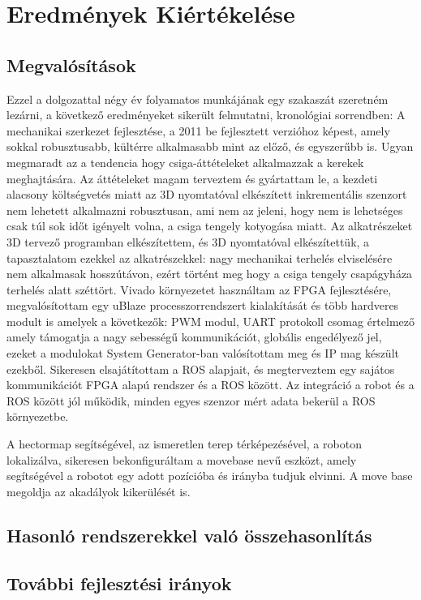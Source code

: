 \chapter{Eredmények Kiértékelése}
\section{Megvalósítások}
Ezzel a dolgozattal négy év folyamatos munkájának egy szakaszát szeretném lezárni, a következő eredményeket sikerült felmutatni, kronológiai sorrendben: 
A mechanikai szerkezet fejlesztése, a 2011 be fejlesztett verzióhoz képest, amely sokkal robusztusabb, kültérre alkalmasabb mint az előző, és egyszerűbb is. Ugyan megmaradt az a tendencia hogy csiga-áttételeket alkalmazzak a kerekek meghajtására. Az áttételeket magam terveztem és gyártattam le, a kezdeti alacsony költségvetés miatt az 3D nyomtatóval elkészített inkrementális szenzort nem lehetett alkalmazni robusztusan, ami nem az jeleni, hogy nem is lehetséges csak túl sok időt igényelt volna, a csiga tengely kotyogása miatt.
Az alkatrészeket 3D tervező programban elkészítettem, és 3D nyomtatóval elkészítettük, a tapasztalatom ezekkel az alkatrészekkel: nagy mechanikai terhelés elviselésére nem alkalmasak hosszútávon, ezért történt meg hogy a csiga tengely csapágyháza terhelés alatt széttört.
Vivado környezetet használtam az FPGA fejlesztésére, megvalósítottam egy uBlaze processzorrendszert kialakítását és több hardveres modult is amelyek a következők: PWM modul, UART protokoll csomag értelmező amely támogatja a nagy sebességű kommunikációt, globális engedélyező jel, ezeket a modulokat System Generator-ban valósítottam meg és IP mag készült ezekből.
Sikeresen elsajátítottam a ROS alapjait, és megterveztem egy sajátos kommunikációt FPGA alapú rendszer és a ROS között. Az integráció a robot és a ROS között jól működik, minden egyes szenzor mért adata bekerül a ROS környezetbe.

A hectormap segítségével, az ismeretlen terep térképezésével, a roboton lokalizálva, sikeresen bekonfiguráltam a movebase nevű eszközt, amely segítségével a robotot egy adott pozícióba és irányba tudjuk elvinni. A move base megoldja az akadályok kikerülését is.


\section{Hasonló rendszerekkel való összehasonlítás}
\section{További fejlesztési irányok}
